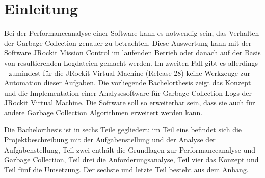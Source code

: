 \chapter*{Einleitung}
Bei der Performanceanalyse einer Software kann es notwendig sein, das  Verhalten der Garbage Collection genauer zu betrachten. Diese Auswertung kann mit der Software JRockit Mission Control im laufenden Betrieb oder danach auf der Basis von resultierenden Logdateien gemacht werden. Im zweiten Fall gibt es allerdings - zumindest für die JRockit Virtual Machine (Release 28) keine Werkzeuge zur Automation dieser Aufgaben. Die vorliegende Bachelorthesis zeigt das Konzept und die Implementation einer Analysesoftware für Garbage Collection Logs der JRockit Virtual Machine. Die Software soll so erweiterbar sein, dass sie auch für andere Garbage Collection Algorithmen erweitert werden kann.

Die Bachelorthesis ist in sechs Teile gegliedert: im Teil eins befindet sich die Projektbeschreibung mit der Aufgabenstellung und der Analyse der Aufgabenstellung, Teil zwei enthält die Grundlagen zur Performanceanalyse und Garbage Collection, Teil drei die Anforderungsanalyse, Teil vier das Konzept und Teil fünf die Umsetzung. Der sechste und letzte Teil besteht aus dem Anhang.